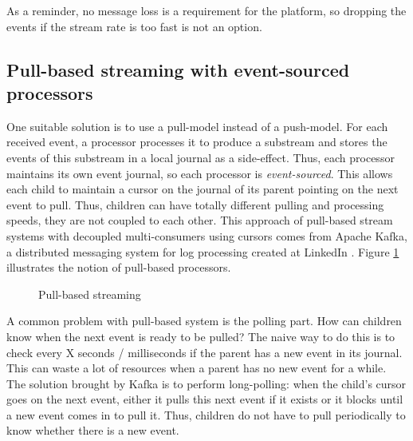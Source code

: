 As a reminder, no message loss is a requirement for the platform, so dropping the events if the stream rate is too fast is not an option.
\\

\subsection{Pull-based streaming with event-sourced processors}

One suitable solution is to use a pull-model instead of a push-model. For each received event, a processor processes it to produce a substream and stores the events of this substream in a local journal as a side-effect. Thus, each processor maintains its own event journal, so each processor is \textit{event-sourced}.
This allows each child to maintain a cursor on the journal of its parent pointing on the next event to pull. Thus, children can have totally different pulling and processing speeds, they are not coupled to each other. This approach of pull-based stream systems with decoupled multi-consumers using cursors comes from Apache Kafka, a distributed messaging system for log processing created at LinkedIn . Figure \ref{fig:pull_processors} illustrates the notion of pull-based processors.

\begin{figure}[h]
  \begin{center} 
    \caption{Pull-based streaming}
    \label{fig:pull_processors}
  \end{center}
\end{figure}

A common problem with pull-based system is the polling part. How can children know when the next event is ready to be pulled? The naive way to do this is to check every X seconds / milliseconds if the parent has a new event in its journal. This can waste a lot of resources when a parent has no new event for a while. The solution brought by Kafka is to 
perform long-polling: when the child's cursor goes on the next event, either it pulls this next event if it exists or it blocks until a new event comes in to pull it. Thus, children do not have to pull periodically to know whether there is a new event.

